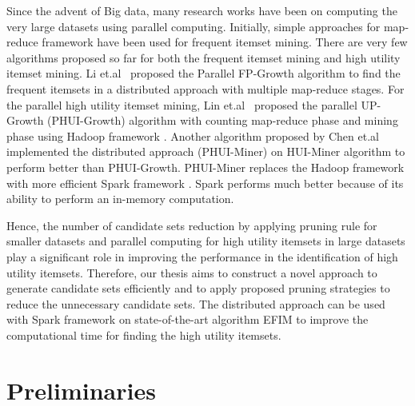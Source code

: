 \documentclass[11pt,openright]{report}
\begin{document}
Since the advent of Big data, many research works have been on computing the very large datasets using parallel computing. Initially, simple approaches for map-reduce framework have been used for frequent itemset mining\cite{Yang2010,Cryans2010}. There are very few algorithms proposed so far for both the frequent itemset mining and high utility itemset mining. Li et.al~\cite{Li2008} proposed the Parallel FP-Growth algorithm to find the frequent itemsets in a distributed approach with multiple map-reduce stages. For the parallel high utility itemset mining, Lin et.al~\cite{Lin2015} proposed the parallel UP-Growth (PHUI-Growth) algorithm with counting map-reduce phase and mining phase using Hadoop framework \cite{Dean2008}. Another algorithm proposed by Chen et.al~\cite{Chen2016} implemented the distributed approach (PHUI-Miner) on HUI-Miner algorithm \cite{Liu2012} to perform better than PHUI-Growth. PHUI-Miner replaces the Hadoop framework \cite{Dean2008} with more efficient Spark framework \cite{Zaharia2010}. Spark performs much better because of its ability to perform an in-memory computation.

Hence, the number of candidate sets reduction by applying pruning rule for smaller datasets and parallel computing for high utility itemsets in large datasets play a significant role in improving the performance in the identification of high utility itemsets. Therefore, our thesis aims to construct a novel approach to generate candidate sets efficiently and to apply proposed pruning strategies to reduce the unnecessary candidate sets. The distributed approach can be used with Spark framework on state-of-the-art algorithm EFIM \cite{Zida2015} to improve the computational time for finding the high utility itemsets.


\section{Preliminaries}\label{section:preliminaries}
\end{document}
